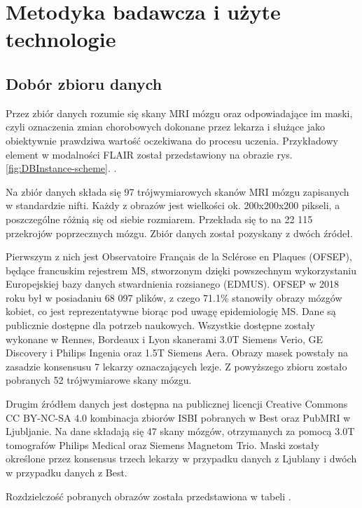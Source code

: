 \section{Metodyka badawcza i użyte technologie}
\subsection{Dobór zbioru danych}
\label{sec:DatasetSelection}
\par
Przez zbiór danych rozumie się skany MRI mózgu oraz odpowiadające im maski, czyli oznaczenia zmian chorobowych dokonane przez lekarza i służące jako obiektywnie prawdziwa wartość oczekiwana do procesu uczenia. Przykładowy element w modalności FLAIR został przedstawiony na obrazie rys. \ref{fig:DBInstance-scheme}. .
\par
Na zbiór danych składa się 97 trójwymiarowych skanów MRI mózgu zapisanych w standardzie nifti. Każdy z obrazów jest wielkości ok. 200x200x200 pikseli, a poszczególne różnią się od siebie rozmiarem. Przekłada się to na 22 115 przekrojów poprzecznych mózgu. Zbiór danych został pozyskany z dwóch źródeł\cite{malinin2022shifts}. 
\par 
Pierwszym z nich jest Observatoire Français de la Sclérose en Plaques (OFSEP), będące francuskim rejestrem MS, stworzonym dzięki powszechnym wykorzystaniu Europejskiej bazy danych stwardnienia rozsianego (EDMUS)\cite{Vukusic2020-mg}\cite{Confavreux1992-em}. OFSEP w 2018 roku był w posiadaniu 68 097 plików, z czego 71.1\% stanowiły obrazy mózgów kobiet, co jest reprezentatywne biorąc pod uwagę epidemiologię MS. Dane są publicznie dostępne dla potrzeb naukowych. Wszystkie dostępne zostały wykonane w Rennes, Bordeaux i Lyon skanerami 3.0T Siemens Verio, GE Discovery i Philips Ingenia oraz 1.5T Siemens Aera. Obrazy masek powstały na zasadzie konsensusu 7 lekarzy oznaczających lezje. Z powyższego zbioru zostało pobranych 52 trójwymiarowe skany mózgu. 
\par
Drugim źródłem danych jest dostępna na publicznej licencji  Creative Commons CC BY-NC-SA 4.0 kombinacja zbiorów ISBI pobranych w Best\cite{Carass2017-xz}\cite{Carass2017-al} oraz PubMRI w Ljubljanie\cite{Lesjak2018-vo}. Na dane składają się 47 skany mózgów, otrzymanych za pomocą 3.0T tomografów Philips Medical oraz Siemens Magnetom Trio. Maski zostały określone przez konsensus trzech lekarzy w przypadku danych z Ljublany i dwóch w przypadku danych z Best. 
\par Rozdzielczość pobranych obrazów została przedstawiona w tabeli .

